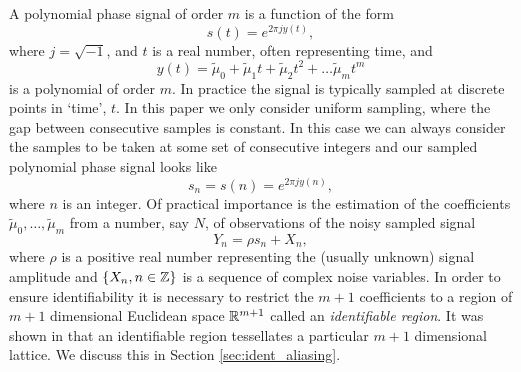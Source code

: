 \documentclass[journal]{IEEEtran}
\begin{document}
A polynomial phase signal of order $m$ is a function of the form
\[
s(t) = e^{2\pi j y(t)},
\]
where $j = \sqrt{-1}$, and $t$ is a real number, often representing time, and 
\[
y(t) = \tilde{\mu}_0 +\tilde{\mu}_1 t + \tilde{\mu}_2 t^2 + \dots \tilde{\mu}_m t^m
\]
is a polynomial of order $m$.  In practice the signal is typically sampled at discrete points in `time', $t$. In this paper we only consider uniform sampling, where the gap between consecutive samples is constant. In this case we can always consider the samples to be taken at some set of consecutive integers and our sampled polynomial phase signal looks like
\[
s_n = s(n) = e^{2\pi j y(n)},
\] 
where $n$ is an integer.  Of practical importance is the estimation of the coefficients $\tilde{\mu}_0, \dots, \tilde{\mu}_m$ from a number, say $N$, of observations of the noisy sampled signal
\begin{equation}\label{eq:Y_nsamplednoisey}
Y_n = \rho s_n + X_n,
\end{equation}
where $\rho$ is a positive real number representing the (usually unknown) signal amplitude and $\{X_n, n \in {\mathbb Z}\}$ is a sequence of complex noise variables. In order to ensure identifiability it is necessary to restrict the $m+1$ coefficients to a region of $m+1$ dimensional Euclidean space ${\mathbb R}^{m+1}$ called an \emph{identifiable region}.  It was shown in \cite{McKilliam2009IndentifiabliltyAliasingPolyphase} that an identifiable region tessellates a particular $m+1$ dimensional lattice.  We discuss this in Section \ref{sec:ident_aliasing}.
\end{document}
